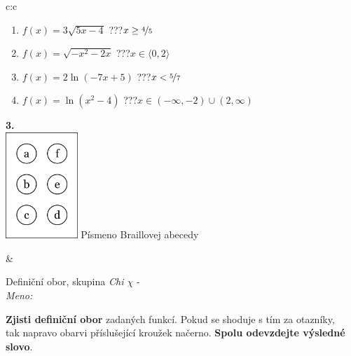\documentclass[10pt]{report}
\begin{document}
\begin{tabular}{c:c}
\begin{minipage}[c][104.5mm][t]{0.5\linewidth}
\begin{center}
\begin{minipage}{0.79\linewidth}
\begin{center}
\begin{varwidth}{\linewidth}
\begin{enumerate}
\item $f(x)=3\sqrt{5x-4}$\quad \dotfill\; ???\;\dotfill \quad $x\geq\nicefrac{4}{5}$
\item $f(x)=\sqrt{-x^2-2x}$\quad \dotfill\; ???\;\dotfill \quad $x\in\langle0 , 2\rangle$
\item $f(x)=2\ln{(-7x+5)}$\quad \dotfill\; ???\;\dotfill \quad $x<\nicefrac{5}{7}$
\item $f(x)=\ln{(x^2-4)}$\quad \dotfill\; ???\;\dotfill \quad $x\in(-\infty , -2)\cup(2 , \infty)$
\end{enumerate}
\end{varwidth}
\end{center}
\end{minipage}
\begin{minipage}{0.20\linewidth}
\begin{center}
{\Huge\bfseries 3.} \\[2mm]
\includegraphics[height=40mm]{../images/braille.png}
{\small Písmeno Braillovej abecedy}
\end{center}
\end{minipage}
\end{center}
\end{minipage}
&
\begin{minipage}[c][104.5mm][t]{0.5\linewidth}
\begin{center}
\vspace{7mm}
{\huge Definiční obor, skupina \textit{Chi $\chi$} -}\\[5mm]
\textit{Meno:}\phantom{xxxxxxxxxxxxxxxxxxxxxxxxxxxxxxxxxxxxxxxxxxxxxxxxxxxxxxxxxxxxxxxxx}\\[5mm]
\begin{minipage}{0.95\linewidth}
\textbf{Zjisti definiční obor} zadaných funkcí. Pokud se shoduje s tím za otazníky,\\tak napravo obarvi příslušející kroužek načerno. \textbf{Spolu odevzdejte výsledné slovo}.
\end{minipage}
\\[1mm]
\begin{minipage}{0.79\linewidth}
\begin{center}

\end{center}
\end{minipage}
\end{center}
\end{minipage}
\end{tabular}
\end{document}
